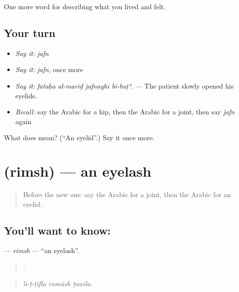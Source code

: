 \begin{grammarlens}[title={What you've built}]
One more word for describing what you lived and felt.
\end{grammarlens}

\subsection*{Your turn}
\begin{itemize}
\raggedright
  \item \emph{Say it:} \emph{jafn}
  \item \emph{Say it:} \emph{jafn}, once more
  \item \emph{Say it:} \emph{fataḥa al-marīḍ jafnayhi bi-buṭʾ.} — The patient slowly opened his eyelids.
  \item \emph{Recall:} say the Arabic for a hip, then the Arabic for a joint, then say \emph{jafn} again
\end{itemize}

\begin{tcolorbox}[breakable,colback=teal!4,colframe=teal!35!black,title={Before you move on}]
What does  mean? (\textquotedblleft{}An eyelid\textquotedblright{}.) Say it once more.
\end{tcolorbox}
\section[\texorpdfstring{\ar{رمش} (rimsh)}{رمش (rimsh)}]{ (rimsh) — an eyelash}

\label{lesson:AR-C506-rimsh}



\begin{quote}
Before the new one: say the Arabic for a joint, then the Arabic for an eyelid.
\end{quote}

\subsection*{You'll want to know: }
\textbf{} — \emph{rimsh} — \textquotedblleft{}an eyelash\textquotedblright{}.

\begin{quote}
  .
\end{quote}

\begin{quote}
\emph{li-ṭ-ṭifla rumūsh ṭawīla.}
\end{quote}

